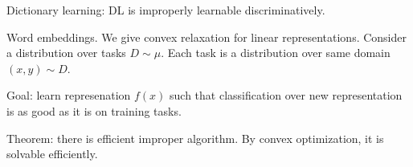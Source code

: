 Dictionary learning: DL is improperly learnable discriminatively.

Word embeddings. We give convex relaxation for linear representations. Consider a distribution over tasks $D\sim \mu$. Each task is a distribution over same domain $(x,y)\sim D$. 

Goal: learn represenation $f(x)$ such that classification over new representation is as good as it is on training tasks.

Theorem: there is efficient improper algorithm. 
By convex optimization, it is solvable efficiently.

